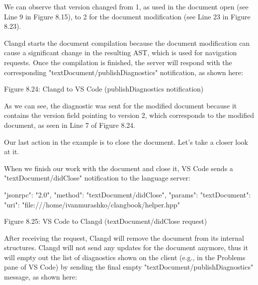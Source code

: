 We can observe that version changed from 1, as used in the document open (see Line 9 in Figure 8.15), to 2 for the document modification (see Line 23 in Figure 8.23).

Clangd starts the document compilation because the document modification can cause a significant change in the resulting AST, which is used for navigation requests. Once the compilation is finished, the server will respond with the corresponding "textDocument/publishDiagnostics" notification, as shown here:

\begin{shell}
{
  "jsonrpc": "2.0",
  "method": "textDocument/publishDiagnostics",
  "params": {
    "diagnostics": [],
    "uri": "file:///home/ivanmurashko/clangbook/helper.hpp",
     "version": 2
}
\end{shell}


\begin{center}
Figure 8.24: Clangd to VS Code (publishDiagnostics notification)
\end{center}

As we can see, the diagnostic was sent for the modified document because it contains the version field pointing to version 2, which corresponds to the modified document, as seen in Line 7 of Figure 8.24.

Our last action in the example is to close the document. Let’s take a closer look at it.


When we finish our work with the document and close it, VS Code sends a "textDocument/didClose" notification to the language server:

\begin{shell}
{
  "jsonrpc": "2.0",
  "method": "textDocument/didClose",
  "params": {
    "textDocument": {
      "uri": "file:///home/ivanmurashko/clangbook/helper.hpp"
    }
  }
}
\end{shell}

\begin{center}
Figure 8.25: VS Code to Clangd (textDocument/didClose request)
\end{center}

After receiving the request, Clangd will remove the document from its internal structures. Clangd will not send any updates for the document anymore, thus it will empty out the list of diagnostics shown on the client (e.g., in the Problems pane of VS Code) by sending the final empty "textDocument/publishDiagnostics" message, as shown here:

